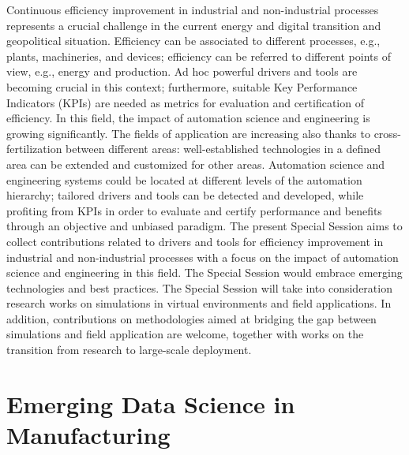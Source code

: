 Continuous efficiency improvement in industrial and non-industrial processes represents a crucial challenge in the current energy and digital transition and geopolitical situation. Efficiency can be associated to different processes, e.g., plants, machineries, and devices; efficiency can be referred to different points of view, e.g., energy and production. Ad hoc powerful drivers and tools are becoming crucial in this context; furthermore, suitable Key Performance Indicators (KPIs) are needed as metrics for evaluation and certification of efficiency. In this field, the impact of automation science and engineering is growing significantly. The fields of application are increasing also thanks to cross-fertilization between different areas: well-established technologies in a defined area can be extended and customized for other areas. Automation science and engineering systems could be located at different levels of the automation hierarchy; tailored drivers and tools can be detected and developed, while profiting from KPIs in order to evaluate and certify performance and benefits through an objective and unbiased paradigm. The present Special Session aims to collect contributions related to drivers and tools for efficiency improvement in industrial and non-industrial processes with a focus on the impact of automation science and engineering in this field. The Special Session would embrace emerging technologies and best practices. The Special Session will take into consideration research works on simulations in virtual environments and field applications. In addition, contributions on methodologies aimed at bridging the gap between simulations and field application are welcome, together with works on the transition from research to large-scale deployment. 

\section{Emerging Data Science in Manufacturing}



